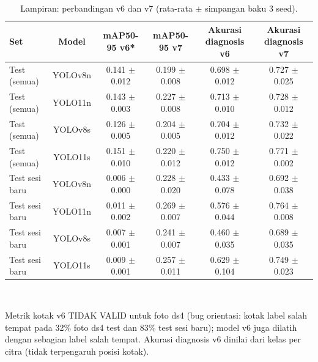 \begin{table}[!t]
\centering
\caption{Lampiran: perbandingan v6 dan v7 (rata-rata $\pm$ simpangan baku 3 seed).}
\label{tab:lampiran_v6_v7}
\footnotesize
\begin{tabular}{lccccc}
\hline
\textbf{Set} & \textbf{Model} & \textbf{mAP50-95 v6*} & \textbf{mAP50-95 v7} & \textbf{Akurasi diagnosis v6} & \textbf{Akurasi diagnosis v7} \\
\hline
Test (semua) & YOLOv8n & 0.141 $\pm$ 0.012 & 0.199 $\pm$ 0.008 & 0.698 $\pm$ 0.012 & 0.727 $\pm$ 0.025 \\
Test (semua) & YOLO11n & 0.143 $\pm$ 0.003 & 0.227 $\pm$ 0.008 & 0.713 $\pm$ 0.010 & 0.728 $\pm$ 0.012 \\
Test (semua) & YOLOv8s & 0.126 $\pm$ 0.005 & 0.204 $\pm$ 0.005 & 0.704 $\pm$ 0.012 & 0.732 $\pm$ 0.022 \\
Test (semua) & YOLO11s & 0.151 $\pm$ 0.010 & 0.220 $\pm$ 0.012 & 0.750 $\pm$ 0.012 & 0.771 $\pm$ 0.002 \\
Test sesi baru & YOLOv8n & 0.006 $\pm$ 0.000 & 0.228 $\pm$ 0.020 & 0.433 $\pm$ 0.078 & 0.692 $\pm$ 0.038 \\
Test sesi baru & YOLO11n & 0.011 $\pm$ 0.002 & 0.269 $\pm$ 0.007 & 0.576 $\pm$ 0.044 & 0.764 $\pm$ 0.008 \\
Test sesi baru & YOLOv8s & 0.007 $\pm$ 0.001 & 0.241 $\pm$ 0.007 & 0.460 $\pm$ 0.035 & 0.689 $\pm$ 0.035 \\
Test sesi baru & YOLO11s & 0.009 $\pm$ 0.001 & 0.257 $\pm$ 0.011 & 0.629 $\pm$ 0.104 & 0.749 $\pm$ 0.023 \\
\hline
\end{tabular}
\\[2pt]\parbox{\columnwidth}{\scriptsize *Metrik kotak v6 TIDAK VALID untuk foto ds4 (bug orientasi: kotak label salah tempat pada 32\% foto ds4 test dan 83\% test sesi baru); model v6 juga dilatih dengan sebagian label salah tempat. Akurasi diagnosis v6 dinilai dari kelas per citra (tidak terpengaruh posisi kotak).}
\end{table}
